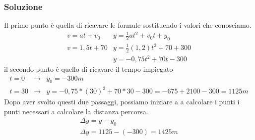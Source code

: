 \subsubsection{Soluzione}
Il primo punto è quella di ricavare le formule sostituendo i valori che
conosciamo.
\begin{equation}
	\begin{matrix}
		v=at+v_0&y=\frac{1}{2}at^2+v_0t+y_0\\
		v=1,5t+70&y=\frac{1}{2}(1,2)t^2+70+300\\
		&y=-0,75t^2+70t-300
	\end{matrix}
\end{equation}
il secondo punto è quello di ricavare il tempo impiegato
\begin{equation}
	\begin{matrix}
		t=0&\to&y_0=-300m\\
		t=30&\to&y=-0,75*(30)^2+70*30-300=-675+2100-300=1125m
	\end{matrix}
\end{equation}
Dopo aver svolto questi due passaggi, possiamo iniziare a a calcolare i punti i
punti necessari a calcolare la distanza percorsa.
\begin{equation}
	\begin{matrix}
		\Delta y=y-y_0\\
		\Delta y=1125-(-300)=1425m
	\end{matrix}
\end{equation}

